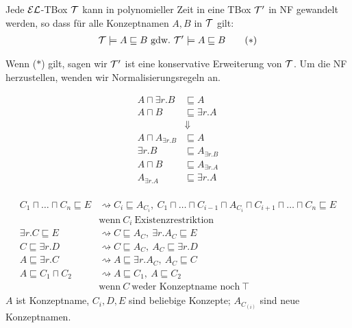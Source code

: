 \begin{lemma}
    Jede $\mathcal{E}\mathcal{L}$-TBox $\mathcal{T}$ kann in polynomieller Zeit in eine TBox $\mathcal{T}'$ in NF gewandelt werden, so dass für alle Konzeptnamen $A, B$ in $\mathcal{T}$ gilt:
    \begin{align*}
        \mathcal{T} \models A\sqsubseteq B\ \text{gdw.}\ \mathcal{T}' \models A\sqsubseteq B
        \tag{$*$}
    \end{align*}
\end{lemma}
Wenn ($*$) gilt, sagen wir $\mathcal{T}'$ ist eine konservative
Erweiterung von $\mathcal{T}$. Um die NF herzustellen, wenden wir
Normalisierungsregeln an.

\begin{tafel}
    \begin{align*}
        A \sqcap \exists r.B &\sqsubseteq A\\
        A \sqcap B &\sqsubseteq \exists r.A\\
                   &\Downarrow\\
        A \sqcap A_{\exists r.B} &\sqsubseteq A\\
        \exists r.B &\sqsubseteq A_{\exists r.B}\\
        A \sqcap B &\sqsubseteq A_{\exists r.A}\\
        A_{\exists r.A} &\sqsubseteq \exists r.A\\
    \end{align*}
\end{tafel}

\begin{align*}
    C_1 \sqcap \dots \sqcap C_n \sqsubseteq E
    &\rightsquigarrow
    C_i \sqsubseteq A_{C_i},\ C_1 \sqcap \dots \sqcap C_{i - 1} \sqcap A_{C_i} \sqcap C_{i + 1} \sqcap \dots \sqcap C_n \sqsubseteq E \tag{NF1}\\
    &\text{wenn}\ C_i\ \text{Existenzrestriktion}\\
    \exists r.C \sqsubseteq E
    &\rightsquigarrow
    C \sqsubseteq A_C,\ \exists r.A_C \sqsubseteq E \tag{NF2}\\
    C \sqsubseteq \exists r.D
    &\rightsquigarrow
    C \sqsubseteq A_C,\ A_C \sqsubseteq \exists r.D \tag{NF3}\\
    A \sqsubseteq \exists r.C
    &\rightsquigarrow
    A \sqsubseteq \exists r.A_C,\ A_C \sqsubseteq C \tag{NF4}\\
    A \sqsubseteq C_1 \sqcap C_2
    &\rightsquigarrow
    A \sqsubseteq C_1,\ A \sqsubseteq C_2 \tag{NF5}\\
    &\text{wenn}\ C\ \text{weder Konzeptname noch}\ \top
\end{align*}
$A$ ist Konzeptname, $C_i, D, E$ sind beliebige Konzepte; $A_{C_(i)}$ sind neue Konzeptnamen.

